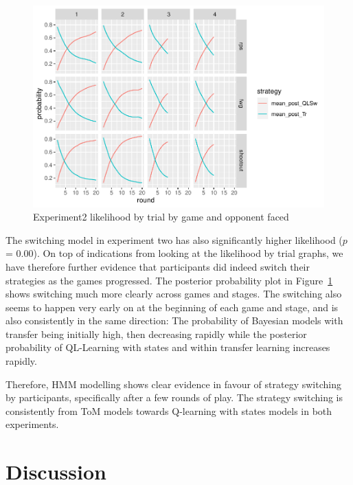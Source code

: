 \documentclass[man,floatsintext]{apa6}
\begin{document}
\begin{figure}

{\centering \includegraphics{draft_report_v3_files/figure-latex/exp2-posteriors-plot-1} 

}

\caption{Experiment2 likelihood by trial by game and opponent faced}\label{fig:exp2-posteriors-plot}
\end{figure}

The switching model in experiment two has also significantly higher likelihood (\(p\) = 0.00). On top of indications from looking at the likelihood by trial graphs, we have therefore further evidence that participants did indeed switch their strategies as the games progressed. The posterior probability plot in Figure~\ref{fig:exp2-posteriors-plot} shows switching much more clearly across games and stages. The switching also seems to happen very early on at the beginning of each game and stage, and is also consistently in the same direction: The probability of Bayesian models with transfer being initially high, then decreasing rapidly while the posterior probability of QL-Learning with states and within transfer learning increases rapidly.

Therefore, HMM modelling shows clear evidence in favour of strategy switching by participants, specifically after a few rounds of play. The strategy switching is consistently from ToM models towards Q-learning with states models in both experiments.

\newpage

\hypertarget{discussion}{%
\section{Discussion}\label{discussion}}
\end{document}
